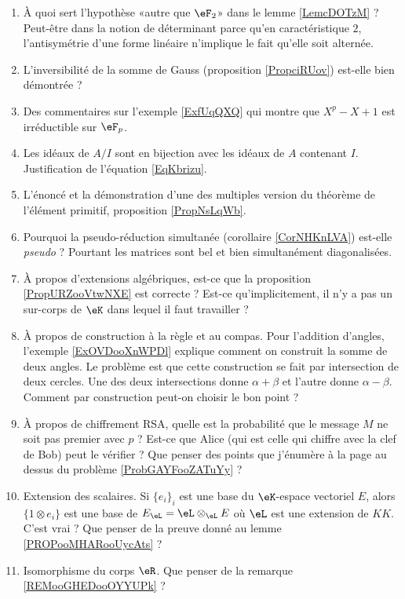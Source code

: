 \begin{enumerate}
    \item
        À quoi sert l'hypothèse «autre que \( \eF_2\)» dans le lemme \ref{LemcDOTzM} ? Peut-être dans la notion de déterminant parce qu'en caractéristique \( 2\), l'antisymétrie d'une forme linéaire n'implique le fait qu'elle soit alternée.
    \item
        L'inversibilité de la somme de Gauss (proposition \ref{PropciRUov}) est-elle bien démontrée ?
    \item
        Des commentaires sur l'exemple \ref{ExfUqQXQ} qui montre que \( X^p-X+1\) est irréductible sur \( \eF_p\).
    \item
        Les idéaux de \( A/I\) sont en bijection avec les idéaux de \( A\) contenant \( I\). Justification de l'équation \eqref{EqKbrizu}.
    \item
        L'énoncé et la démonstration d'une des multiples version du théorème de l'élément primitif, proposition \ref{PropNsLqWb}.
    \item
        Pourquoi la pseudo-réduction simultanée (corollaire \ref{CorNHKnLVA}) est-elle \emph{pseudo} ? Pourtant les matrices sont bel et bien simultanément diagonalisées.
    \item
        À propos d'extensions algébriques, est-ce que la proposition \ref{PropURZooVtwNXE} est correcte ? Est-ce qu'implicitement, il n'y a pas un sur-corps de \( \eK\) dans lequel il faut travailler ?
    \item
        À propos de construction à la règle et au compas. Pour l'addition d'angles, l'exemple \ref{ExOVDooXnWPDl} explique comment on construit la somme de deux angles. Le problème est que cette construction se fait par intersection de deux cercles. Une des deux intersections donne \( \alpha+\beta\) et l'autre donne \( \alpha-\beta\). Comment par construction peut-on choisir le bon point ?
    \item
        À propos de chiffrement RSA, quelle est la probabilité que le message \( M\) ne soit pas premier avec \( p\) ? Est-ce que Alice (qui est celle qui chiffre avec la clef de Bob) peut le vérifier ? Que penser des points que j'énumère à la page \pageref{PageAKTBooMDeQxY} au dessus du problème \ref{ProbGAYFooZATuYy} ?
    \item
        Extension des scalaires. Si \( \{ e_i \}_i\) est une base du \( \eK\)-espace vectoriel \( E\), alors \( \{ 1\otimes e_i \}\) est une base de \( E_{\eL}=\eL\otimes_{\eL}E\) où \( \eL\) est une extension de \( KK\). C'est vrai ? Que penser de la preuve donné au lemme \ref{PROPooMHARooUycAts} ?
    \item
        Isomorphisme du corps \( \eR\). Que penser de la remarque \ref{REMooGHEDooOYYUPk} ?
\end{enumerate}

